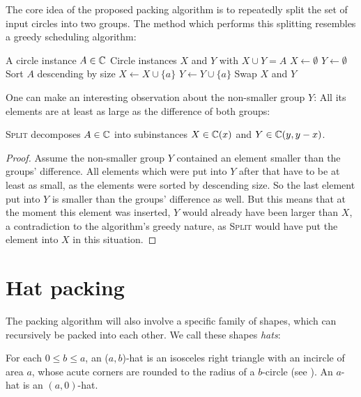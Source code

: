 \documentclass[%
    a4paper,              %
    style=print,          %
    bibliography=totoc,   %
    nexus,                %
    lnum,                 %
    extramargin,          %
]{tubsbook}
\begin{document}
The core idea of the proposed packing algorithm is to repeatedly split the set of input circles into two groups. The method which performs this splitting resembles a greedy scheduling algorithm:

\begin{algorithmic}
    \Require A circle instance $A \in \mathbb{C}$
    \Ensure Circle instances $X$ and $Y$ with $X \cup Y = A$
        \State $X \gets \emptyset$
        \State $Y \gets \emptyset$
        \State Sort $A$ descending by size
                \State $X \gets X \cup \{a\}$
            \Else
                \State $Y \gets Y \cup \{a\}$
            \EndIf
        \EndFor
            \State Swap $X$ and $Y$
        \EndIf
    \EndFunction
\end{algorithmic}

One can make an interesting observation about the non-smaller group $Y$: All its elements are at least as large as the difference of both groups:

\begin{theorem}\label{th:split-property}
    \textsc{Split} decomposes $A \in \mathbb{C}$ into subinstances $X \in \mathbb{C}(x)$ and $Y \in \mathbb{C}(y,y-x)$.
\end{theorem}

\begin{proof}
    Assume the non-smaller group $Y$ contained an element smaller than the groups' difference. All elements which were put into $Y$ after that have to be at least as small, as the elements were sorted by descending size. So the last element put into $Y$ is smaller than the groups' difference as well. But this means that at the moment this element was inserted, $Y$ would already have been larger than $X$, a contradiction to the algorithm's greedy nature, as \textsc{Split} would have put the element into $X$ in this situation.
\end{proof}


\section{Hat packing}

The packing algorithm will also involve a specific family of shapes, which can recursively be packed into each other. We call these shapes \emph{hats}:

\begin{definition}
    For each $0 \le b \le a$, an ($a,b$)-hat is an isosceles right triangle with an incircle of area $a$, whose acute corners are rounded to the radius of a $b$-circle (see ).
    An $a$-hat is an $(a,0)$-hat.
\end{definition}
\end{document}
